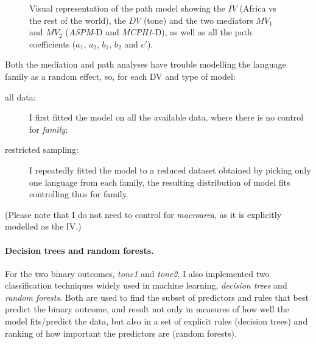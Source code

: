 \documentclass[twoside,onecolumn]{article}
\begin{document}
\begin{figure}[h]
  \centering


  \caption{Visual representation of the path model showing the $IV$ (Africa vs the rest of the world), the $DV$ (tone) and the two mediators $MV_1$ and $MV_2$ (\textit{ASPM}-D and \textit{MCPH1}-D), as well as all the path coefficients ($a_1$, $a_2$, $b_1$, $b_2$ and $c'$). }
  \label{Fig:path_analysis}
\end{figure}

Both the mediation and path analyses have trouble modelling the language family as a random effect, so, for each DV and type of model:

\begin{description}
  \item[all data:] I first fitted the model on all the available data, where there is no control for \textit{family};
  \item[restricted sampling:] I repeatedly fitted the model to a reduced dataset obtained by picking only one language from each family, the resulting distribution of model fits controlling thus for family.
\end{description}

(Please note that I do not need to control for \textit{macroarea}, as it is explicitly modelled as the IV.)


\paragraph{Decision trees and random forests.}

For the two binary outcomes, \textit{tone1} and \textit{tone2}, I also implemented two classification techniques widely used in machine learning, \emph{decision trees} and \emph{random forests}.
Both are used to find the subset of predictors and rules that best predict the binary outcome, and result not only in measures of how well the model fits/predict the data, but also in a set of explicit rules (decision trees) and ranking of how important the predictors are (random forests).
\end{document}
